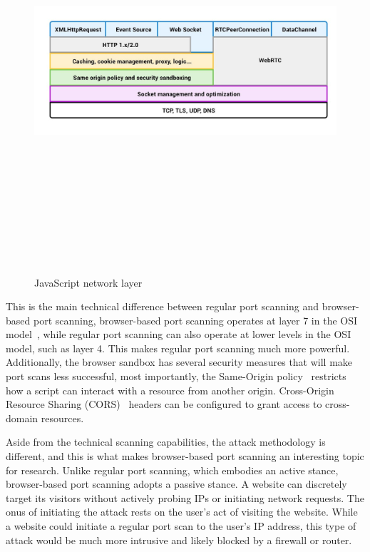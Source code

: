 \begin{figure}[h]
    \centering
    \includegraphics[width=15cm, height=15cm, keepaspectratio]{background/img/js_network_stack.jpg}
    \caption{JavaScript network layer~\protect{}}
    \label{fig:js-network-stack}
\end{figure}

This is the main technical difference between regular port scanning and browser-based port scanning, browser-based port scanning operates at layer 7 in the OSI model~, while regular port scanning can also operate at lower levels in the OSI model, such as layer 4. 
This makes regular port scanning much more powerful.
Additionally, the browser sandbox has several security measures that will make port scans less successful, most importantly, the Same-Origin policy~ restricts how a script can interact with a resource from another origin. Cross-Origin Resource Sharing (CORS)~ headers can be configured to grant access to cross-domain resources. 

Aside from the technical scanning capabilities, the attack methodology is different, and this is what makes browser-based port scanning an interesting topic for research. 
Unlike regular port scanning, which embodies an active stance, browser-based port scanning adopts a passive stance. 
A website can discretely target its visitors without actively probing IPs or initiating network requests. The onus of initiating the attack rests on the user's act of visiting the website. 
While a website could initiate a regular port scan to the user's IP address, this type of attack would be much more intrusive and likely blocked by a firewall or router.

